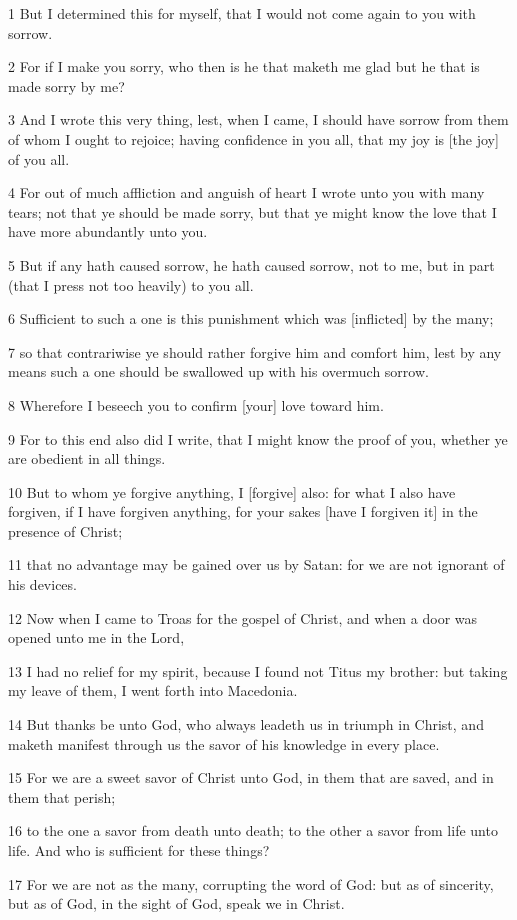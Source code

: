 \par 1 But I determined this for myself, that I would not come again to you with sorrow.
\par 2 For if I make you sorry, who then is he that maketh me glad but he that is made sorry by me?
\par 3 And I wrote this very thing, lest, when I came, I should have sorrow from them of whom I ought to rejoice; having confidence in you all, that my joy is [the joy] of you all.
\par 4 For out of much affliction and anguish of heart I wrote unto you with many tears; not that ye should be made sorry, but that ye might know the love that I have more abundantly unto you.
\par 5 But if any hath caused sorrow, he hath caused sorrow, not to me, but in part (that I press not too heavily) to you all.
\par 6 Sufficient to such a one is this punishment which was [inflicted] by the many;
\par 7 so that contrariwise ye should rather forgive him and comfort him, lest by any means such a one should be swallowed up with his overmuch sorrow.
\par 8 Wherefore I beseech you to confirm [your] love toward him.
\par 9 For to this end also did I write, that I might know the proof of you, whether ye are obedient in all things.
\par 10 But to whom ye forgive anything, I [forgive] also: for what I also have forgiven, if I have forgiven anything, for your sakes [have I forgiven it] in the presence of Christ;
\par 11 that no advantage may be gained over us by Satan: for we are not ignorant of his devices.
\par 12 Now when I came to Troas for the gospel of Christ, and when a door was opened unto me in the Lord,
\par 13 I had no relief for my spirit, because I found not Titus my brother: but taking my leave of them, I went forth into Macedonia.
\par 14 But thanks be unto God, who always leadeth us in triumph in Christ, and maketh manifest through us the savor of his knowledge in every place.
\par 15 For we are a sweet savor of Christ unto God, in them that are saved, and in them that perish;
\par 16 to the one a savor from death unto death; to the other a savor from life unto life. And who is sufficient for these things?
\par 17 For we are not as the many, corrupting the word of God: but as of sincerity, but as of God, in the sight of God, speak we in Christ.

